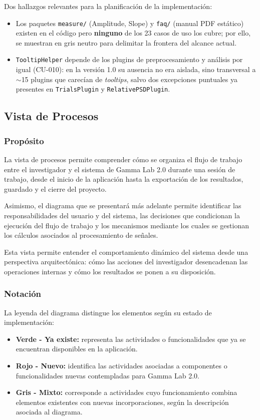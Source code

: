 \documentclass[11pt,a4paper]{article}
\DeclareRobustCommand{\_}{\textunderscore\allowbreak}
\begin{document}
Dos hallazgos relevantes para la planificaci\'on de la implementaci\'on:
\begin{itemize}[nosep]
    \item Los paquetes \texttt{measure/} (Amplitude, Slope) y \texttt{faq/} (manual PDF est\'atico) existen en el c\'odigo pero \textbf{ninguno} de los 23 casos de uso los cubre; por ello, se muestran en gris neutro para delimitar la frontera del alcance actual.
    \item \texttt{TooltipHelper} depende de los plugins de preprocesamiento y an\'alisis por igual (CU-010): en la versión 1.0 su ausencia no era aislada, sino transversal a $\sim$15 plugins que carecían de \textit{tooltips}, salvo dos excepciones puntuales ya presentes en \texttt{TrialsPlugin} y \texttt{RelativePSDPlugin}.
\end{itemize}

\subsection{Vista de Procesos}

\subsubsection{Propósito}
La vista de procesos permite comprender cómo se organiza el flujo de trabajo entre el investigador y el sistema de Gamma Lab 2.0 durante una sesión de trabajo, desde el inicio de la aplicación hasta la exportación de los resultados, guardado y el cierre del proyecto.

Asimismo, el diagrama que se presentará más adelante permite identificar las responsabilidades del usuario y del sistema, las decisiones que condicionan la ejecución del flujo de trabajo y los mecanismos mediante los cuales se gestionan los cálculos asociados al procesamiento de señales.

Esta vista permite entender el comportamiento dinámico del sistema desde una perspectiva arquitectónica: cómo las acciones del investigador desencadenan las operaciones internas y cómo los resultados se ponen a su disposición.

\subsubsection{Notación}
La leyenda del diagrama distingue los elementos según su estado de implementación:

\begin{itemize}
    \item \textbf{Verde - Ya existe:} representa las actividades o funcionalidades que ya se encuentran disponibles en la aplicación.
    
    \item \textbf{Rojo - Nuevo:} identifica las actividades asociadas a componentes o funcionalidades nuevas contempladas para Gamma Lab 2.0.
    
    \item \textbf{Gris - Mixto:} corresponde a actividades cuyo funcionamiento combina elementos existentes con nuevas incorporaciones, según la descripción asociada al diagrama.

\end{itemize}
\end{document}
